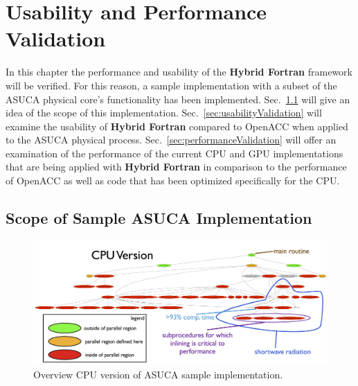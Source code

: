 \chapter{Usability and Performance Validation} \label{cha:analysis}

In this chapter the performance and usability of the \textbf{Hybrid Fortran} framework will be verified. For this reason, a sample implementation with a subset of the ASUCA physical core's functionality has been implemented. Sec.~\ref{sec:asucaRadImplementation} will give an idea of the scope of this implementation. Sec.~\ref{sec:usabilityValidation} will examine the usability of \textbf{Hybrid Fortran} compared to OpenACC when applied to the ASUCA physical process. Sec.~\ref{sec:performanceValidation} will offer an examination of the performance of the current CPU and GPU implementations that are being applied with \textbf{Hybrid Fortran} in comparison to the performance of OpenACC as well as code that has been optimized specifically for the CPU.

\section{Scope of Sample ASUCA Implementation} \label{sec:asucaRadImplementation}

\begin{figure}[htpb]
        \centering
        \includegraphics[width=14cm]{figures/asucaPPImplementationCPU}
        \caption[CPU Version of Sample Hybrid Fortran Implementation]{Overview CPU version of ASUCA sample implementation.}
        \label{figure:asucaPPImplementationCPU}
\end{figure}

